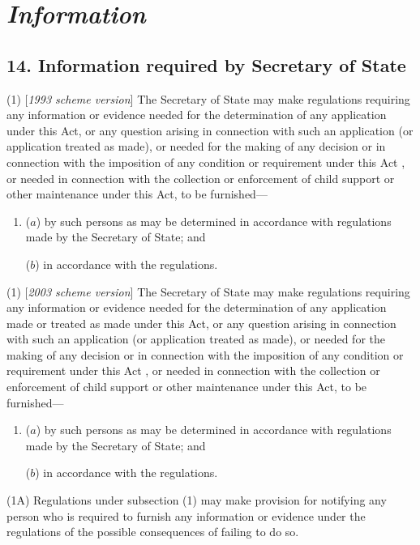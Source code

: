 \documentclass[12pt,a4paper]{article}
\begin{document}
\section{\itshape Information}

\subsection{14. Information required by Secretary of State}

(1) [\emph{1993 scheme version}] The Secretary of State may make regulations requiring any information or evidence needed for the determination of any application under this Act, or any question arising in connection with such an application
(or application treated as made), or needed for the making of any decision or in connection with the imposition of any condition or requirement under this Act%
, or needed in connection with the collection or enforcement of child support or other maintenance under this Act, to be furnished—
\begin{enumerate}\item[]
($a$) by such persons as may be determined in accordance with regulations made by the Secretary of State; and

($b$) in accordance with the regulations.
\end{enumerate}

(1) [\emph{2003 scheme version}] The Secretary of State may make regulations requiring any information or evidence needed for the determination of any application 
made or treated as made  %
under this Act, or any question arising in connection with such an application
(or application treated as made), or needed for the making of any decision or in connection with the imposition of any condition or requirement under this Act%
, or needed in connection with the collection or enforcement of child support or other maintenance under this Act, to be furnished—
\begin{enumerate}\item[]
($a$) by such persons as may be determined in accordance with regulations made by the Secretary of State; and

($b$) in accordance with the regulations.
\end{enumerate}

(1A) Regulations under subsection (1) may make provision for notifying any person who is required to furnish any information or evidence under the regulations of the possible consequences of failing to do so.
\end{document}
